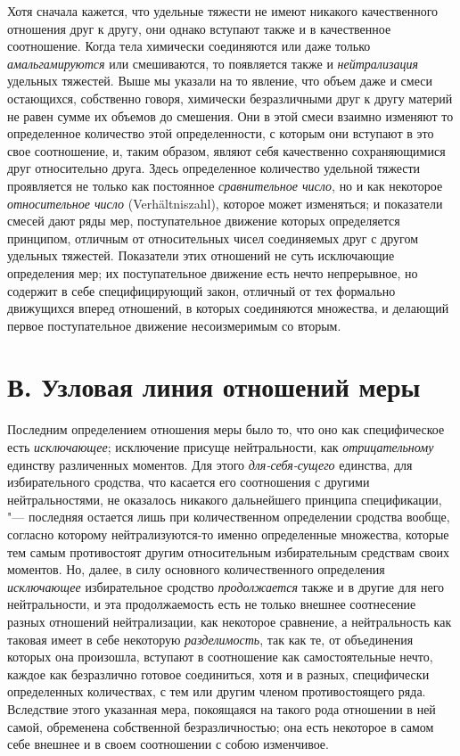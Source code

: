 Хотя сначала кажется, что удельные тяжести не имеют никакого качественного
отношения друг к другу, они однако вступают также и в качественное
соотношение. Когда тела химически соединяются или даже только
{\em амальгамируются} или смешиваются, то появляется
также и {\em нейтрализация} удельных тяжестей. Выше мы
указали на то явление, что объем даже и смеси остающихся, собственно
говоря, химически безразличными друг к другу материй не равен сумме их
объемов до смешения. Они в этой смеси взаимно изменяют то определенное
количество этой определенности, с которым они вступают в это свое
соотношение, и, таким образом, являют себя качественно сохраняющимися друг
относительно друга. Здесь определенное количество удельной тяжести
проявляется не только как постоянное {\em сравнительное
число}, но и как некоторое {\em относительное число}
(Verhältniszahl), которое может изменяться; и показатели смесей дают ряды
мер, поступательное движение которых определяется принципом, отличным от
относительных чисел соединяемых друг с другом удельных тяжестей. Показатели
этих отношений не суть исключающие определения мер; их поступательное
движение есть нечто непрерывное, но содержит в себе специфицирующий закон,
отличный от тех формально движущихся вперед отношений, в которых
соединяются множества, и делающий первое поступательное движение
несоизмеримым со вторым.


\section[В. Узловая линия отношений меры]{В. Узловая линия отношений меры}

Последним определением отношения меры было то,
что оно как специфическое есть {\em исключающее};
исключение присуще нейтральности, как
{\em отрицательному} единству различенных моментов. Для
этого {\em для-себя-сущего} единства, для
избирательного сродства, что касается его соотношения с другими
нейтральностями, не оказалось никакого дальнейшего принципа спецификации, "---
последняя остается лишь при количественном определении сродства вообще,
согласно которому нейтрализуются-то именно определенные множества, которые
тем самым противостоят другим относительным избирательным средствам своих
моментов. Но, далее, в силу основного количественного определения
{\em исключающее} избирательное сродство
{\em продолжается} также и в другие для него
нейтральности, и эта продолжаемость есть не только внешнее соотнесение
разных отношений нейтрализации, как некоторое сравнение, а нейтральность
как таковая имеет в себе некоторую {\em разделимость},
так как те, от объединения которых она произошла, вступают в соотношение
как самостоятельные нечто, каждое как безразлично готовое соединиться, хотя
и в разных, специфически определенных количествах, с тем или другим членом
противостоящего ряда. Вследствие этого указанная мера, покоящаяся на такого
рода отношении в ней самой, обременена собственной безразличностью; она
есть некоторое в самом себе внешнее и в своем соотношении с собою
изменчивое.

